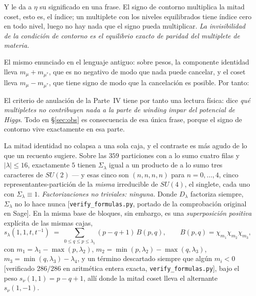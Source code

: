 \documentclass[11pt,a4paper]{article}
\newcommand{\su}[1]{SU(#1)}
\newcommand{\Sig}{\Sigma_\lambda}
\newcommand{\Dl}{D_\lambda}
\begin{document}
Y le da a $\eta$ su significado en una frase. El signo de contorno multiplica la mitad coset, esto
es, el índice; un multiplete con los niveles equilibrados tiene índice cero en todo nivel, luego no
hay nada que el signo pueda multiplicar. \emph{La invisibilidad de la condición de contorno es el
equilibrio exacto de paridad del multiplete de materia.}

\medskip
El mismo enunciado en el lenguaje antiguo: sobre pesos, la componente identidad lleva
$m_\mu+m_{\mu^*}$, que es no negativo de modo que nada puede cancelar, y el coset lleva
$m_\mu-m_{\mu^*}$, que tiene signo de modo que la cancelación es posible. Por tanto:

\begin{center}
\end{center}

\noindent El criterio de anulación de la Parte~IV tiene por tanto una lectura física: dice \emph{qué
multipletes no contribuyen nada a la parte de winding impar del potencial de Higgs}. Todo en
\S\ref{sec:obs} es consecuencia de esa única frase, porque el signo de contorno vive exactamente en
esa parte.

La mitad identidad no colapsa a una sola caja, y el contraste es más agudo de lo que un recuento
sugiere. Sobre las $359$ particiones con a lo sumo cuatro filas y $|\lambda|\le16$, exactamente $5$
tienen $\Sig$ igual a un producto de a lo sumo tres caracteres de $\su2$ --- y esas cinco son
$(n,n,n,n)$ para $n=0,\dots,4$, cinco representantes-partición de la \emph{misma} irreducible de
$\su4$, el singlete, cada uno con $\Sig\equiv1$. \emph{Factorizaciones no triviales: ninguna.} Donde
$\Dl$ factoriza siempre, $\Sig$ no lo hace nunca [\texttt{verify\_formulas.py}, portado de la
comprobación original en Sage]. En la misma base de bloques, sin embargo, es una
\emph{superposición positiva} explícita de las mismas cajas,
\begin{equation}\label{eq:evenstack}
s_\lambda(1,1,t,t^{-1}) \;=\; \sum_{0\le q\le p\le\lambda_1}(p-q+1)\,B(p,q),
\qquad B(p,q)=\chi_{m_1}\chi_{m_2}\chi_{m_3},
\end{equation}
con $m_1=\lambda_1-\max(p,\lambda_2)$, $m_2=\min(p,\lambda_2)-\max(q,\lambda_3)$,
$m_3=\min(q,\lambda_3)-\lambda_4$, y un término descartado siempre que algún $m_i<0$ [verificado
$286/286$ en aritmética entera exacta, \texttt{verify\_formulas.py}], bajo el peso
$s_\nu(1,1)=p-q+1$, allí donde la mitad coset lleva el alternante $s_\nu(1,-1)$.
\end{document}

